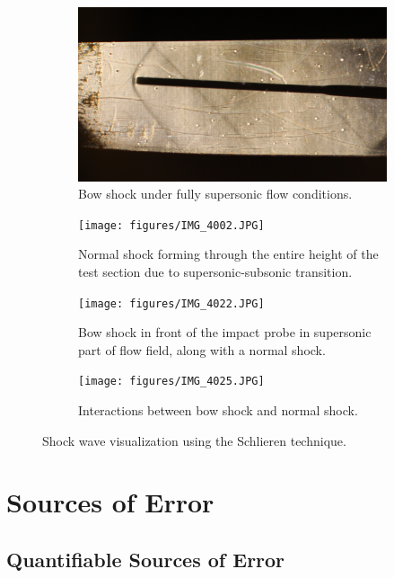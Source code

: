 \documentclass[runningheads]{llncs}
\begin{document}
\begin{figure}[h]
    \centering
    \begin{subfigure}{0.49\textwidth}
    \includegraphics[width=\textwidth]{figures/IMG_3994.JPG}
    \caption{Bow shock under fully supersonic flow conditions.}
    \label{fig:schlieren_1}
    \end{subfigure}
    \hfill
    \begin{subfigure}{0.49\textwidth}
    \texttt{[image: figures/IMG\_4002.JPG]}
    \caption{Normal shock forming through the entire height of the test section due to supersonic-subsonic transition.}
    \label{fig:schlieren_2}
    \end{subfigure}
    \begin{subfigure}{0.49\textwidth}
    \texttt{[image: figures/IMG\_4022.JPG]}
    \caption{Bow shock in front of the impact probe in supersonic part of flow field, along with a normal shock.}
    \label{fig:schlieren_3}
    \end{subfigure}
    \hfill
    \begin{subfigure}{0.49\textwidth}
    \texttt{[image: figures/IMG\_4025.JPG]}
    \caption{Interactions between bow shock and normal shock.}
    \label{fig:schlieren_4}
    \end{subfigure}
    \caption{Shock wave visualization using the Schlieren technique.}
    \label{fig:schlieren_imaging}
\end{figure}



\section{Sources of Error}
\label{sec:source_of_error}

\subsection{Quantifiable Sources of Error}
\end{document}
